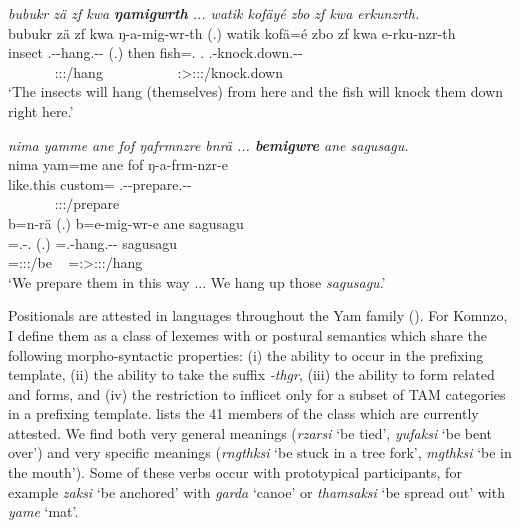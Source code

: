 \begin{exe}
	\ex \emph{bubukr zä zf kwa \textbf{ŋamigwrth} ... watik kofäyé zbo zf kwa erkunzrth.}\\
	\glll bubukr zä zf kwa ŋ-a-mig-wr-th (.) watik kofä=é zbo zf kwa e-rku-nzr-th\\
	insect {\Prox} {\Imm} {\Fut} \M.\Alph-\Vc-hang.\Ext-\Ndu-\Stnsg{} (.) then fish=\Erg.{\Nsg} \Prox.{\All} {\Imm} {\Fut} \Stnsg.\Alph-knock.down.\Ext-\Ndu-\Stnsg\\
	~ ~ ~ ~ {\footnotesize \Stpl:\Sbj:\Nonpast:\Ipfv/hang} ~ ~ ~ ~ ~ ~ {\footnotesize \Stpl:\Sbj>\Stpl:\Obj:\Nonpast:\Ipfv/knock.down}\\
	\trans `The insects will hang (themselves) from here and the fish will knock them down right here.' 
	\label{ex326}
\end{exe}
\begin{exe}
	\ex \emph{nima yamme ane fof ŋafrmnzre bnrä ... \textbf{bemigwre} ane sagusagu.}\\
	\glll nima yam=me ane fof ŋ-a-frm-nzr-e \\
	like.this custom={\Ins} {\Dem} {\Emph} \M.\Alph-\Vc-prepare.\Ext-\Ndu-{\Fnsg}\\
	~ ~ ~ ~ {\footnotesize \Fpl:\Sbj:\Nonpast:\Ipfv/prepare}\\
	\sn
	\glll b=n-rä (.) b=e-mig-wr-e ane sagusagu\\
	\Med=\Fnsg.\Alph-\Cop.{\Ndu} (.) \Med=\Stnsg.\Alph-hang.\Ext-\Ndu-{\Fnsg} {\Dem} sagusagu\\
	{\footnotesize \Med=\Fpl:\Sbj:\Nonpast:\Ipfv/be} ~ {\footnotesize \Med=\Fpl:\Sbj>\Stpl:\Obj:\Nonpast:\Ipfv/hang} ~ ~\\
	\trans `We prepare them in this way ... We hang up those \emph{sagusagu}.'
	\label{ex327}
\end{exe}

Positionals are attested in languages throughout the Yam family (\citealt{Evans:2014bz}). For Komnzo, I define them as a class of lexemes with  or postural semantics which share the following morpho-syntactic properties: (i) the ability to occur in the prefixing template, (ii) the ability to take the  suffix \emph{-thgr}, (iii) the ability to form related  and   forms, and (iv) the restriction to inflicet only for a subset of TAM categories in a prefixing template.  lists the 41 members of the class which are currently attested. We find both very general meanings (\emph{rzarsi} `be tied', \emph{yufaksi} `be bent over') and very specific meanings (\emph{rngthksi} `be stuck in a tree fork', \emph{mgthksi} `be in the mouth'). Some of these verbs occur with prototypical participants, for example \emph{zaksi} `be anchored' with \emph{garda} `canoe' or \emph{thamsaksi} `be spread out' with \emph{yame} `mat'.

